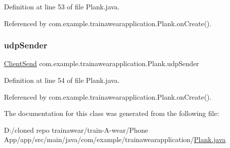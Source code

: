 Definition at line 53 of file Plank.\+java.



Referenced by com.\+example.\+trainawearapplication.\+Plank.\+on\+Create().

\mbox{\label{classcom_1_1example_1_1trainawearapplication_1_1_plank_a840985b7a4ec5f3092c91a8336e616e9}} 
\subsubsection{\texorpdfstring{udpSender}{udpSender}}
{\footnotesize\ttfamily \mbox{\hyperlink{classcom_1_1example_1_1trainawearapplication_1_1_client_send}{Client\+Send}} com.\+example.\+trainawearapplication.\+Plank.\+udp\+Sender\hspace{0.3cm}{\ttfamily [private]}}



Definition at line 54 of file Plank.\+java.



Referenced by com.\+example.\+trainawearapplication.\+Plank.\+on\+Create().



The documentation for this class was generated from the following file\+:\begin{DoxyCompactItemize}
\item 
D\+:/cloned repo trainawear/train-\/\+A-\/wear/\+Phone App/app/src/main/java/com/example/trainawearapplication/\mbox{\hyperlink{_plank_8java}{Plank.\+java}}\end{DoxyCompactItemize}
